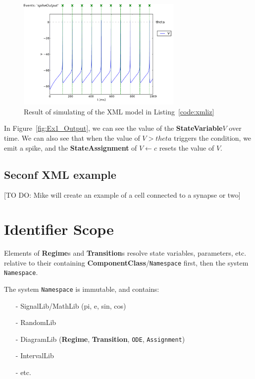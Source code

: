 \documentclass{article}
\newcommand{\ComponentClass}{{\bf{ComponentClass}}\xspace}
\newcommand{\StateVariable}{{\bf{StateVariable}}\xspace}
\newcommand{\StateAssignment}{{\bf{StateAssignment}}\xspace}
\newcommand{\Regime}{{\bf{Regime}}\xspace}
\newcommand{\Regimes}{{\bf{Regime}}s\xspace}
\newcommand{\Transition}{{\bf{Transition}}\xspace}
\newcommand{\Transitions}{{\bf{Transition}}s\xspace}
\begin{document}
\begin{figure}[htb!]
\center
\includegraphics[width=8cm]{figures/example_IzVoltageWave.pdf}
\protect\caption{Result of simulating of the XML model in Listing~\ref{code:xmliz}}
\label{fig:EX1_Output}
\end{figure}

In Figure~\ref{fig:Ex1_Output}, we can see the value of the \StateVariable $V$
over time. We can also see that when the value of $V>theta$ triggers the
condition, we emit a spike, and the \StateAssignment of $V \leftarrow c$ resets
the value of $V$.

\subsection{Seconf XML example}

[TO DO: Mike will create an example of a cell connected to a synapse or two]

\pagebreak

\section{Identifier Scope}
\label{scope}

Elements of \Regimes and \Transitions resolve state
variables, parameters, etc. relative to their containing
\ComponentClass/{\tt Namespace} first, then the system {\tt Namespace}.

The system {\tt Namespace} is immutable, and contains:
\begin{itemize}
\item[-]{SignalLib/MathLib (pi, e, sin, cos)}
\item[-]{RandomLib}
\item[-]{DiagramLib (\Regime, \Transition, {\tt ODE},
{\tt Assignment})}
\item[-]{IntervalLib}
\item[-]{etc.}
\end{itemize}
\end{document}
